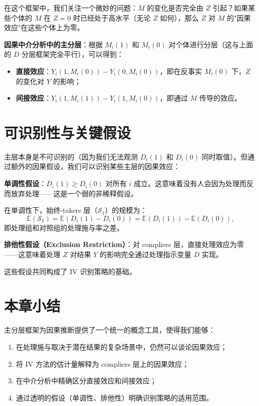 在这个框架中，我们关注一个微妙的问题：$M$ 的变化是否完全由 $Z$ 引起？如果某些个体的 $M$ 在 $Z=0$ 时已经处于高水平（无论 $Z$ 如何），那么 $Z$ 对 $M$ 的"因果效应"在这些个体上为零。

\textbf{因果中介分析中的主分层}：根据 $M_i(1)$ 和 $M_i(0)$ 对个体进行分层（这与上面的 $D$ 分层框架完全平行），可以得到：
\begin{itemize}
\item \textbf{直接效应}：$Y_i(1, M_i(0)) - Y_i(0, M_i(0))$，即在反事实 $M_i(0)$ 下，$Z$ 的变化对 $Y$ 的影响；
  \item \textbf{间接效应}：$Y_i(1, M_i(1)) - Y_i(1, M_i(0))$，即通过 $M$ 传导的效应。
\end{itemize}

\section{可识别性与关键假设}\label{sec:26-identify}

主层本身是不可识别的（因为我们无法观测 $D_i(1)$ 和 $D_i(0)$ 同时取值）。但通过额外的因果假设，我们可以识别某些主层的因果效应：

\textbf{单调性假设}：$D_i(1) \geq D_i(0)$ 对所有 $i$ 成立。这意味着没有人会因为处理而反而放弃处理——这是一个弱的非稀释假设。

在单调性下，始终-takers 层（$\mathcal{S}_1$）的规模为：
\[
\mathbb{E}(\mathcal{S}_1) = \mathbb{E}(D_i(1) - D_i(0)) = \mathbb{E}(D_i(1)) - \mathbb{E}(D_i(0)),
\]
即处理组和对照组的处理施与率之差。

\textbf{排他性假设（Exclusion Restriction）}：对 compliers 层，直接处理效应为零——这意味着处理 $Z$ 对结果 $Y$ 的影响完全通过处理指示变量 $D$ 实现。

这些假设共同构成了 IV 识别策略的基础。

\section{本章小结}\label{sec:26-summary}

主分层框架为因果推断提供了一个统一的概念工具，使得我们能够：
\begin{enumerate}
  \item 在处理施与取决于潜在结果的复杂场景中，仍然可以谈论因果效应；
  \item 将 IV 方法的估计量解释为 compliers 层上的因果效应；
  \item 在中介分析中精确区分直接效应和间接效应；
  \item 通过透明的假设（单调性、排他性）明确识别策略的适用范围。
\end{enumerate}


